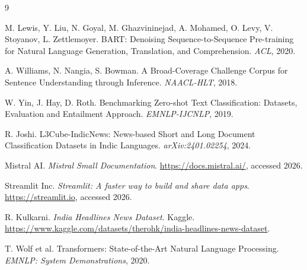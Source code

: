 \documentclass[10pt,twocolumn,letterpaper]{article}
\begin{document}
{\small
\begin{thebibliography}{9}

M. Lewis, Y. Liu, N. Goyal, M. Ghazvininejad, A. Mohamed, O. Levy, V. Stoyanov, L. Zettlemoyer.
\newblock BART: Denoising Sequence-to-Sequence Pre-training for Natural Language Generation, Translation, and Comprehension.
\newblock \emph{ACL}, 2020.

A. Williams, N. Nangia, S. Bowman.
\newblock A Broad-Coverage Challenge Corpus for Sentence Understanding through Inference.
\newblock \emph{NAACL-HLT}, 2018.

W. Yin, J. Hay, D. Roth.
\newblock Benchmarking Zero-shot Text Classification: Datasets, Evaluation and Entailment Approach.
\newblock \emph{EMNLP-IJCNLP}, 2019.

R. Joshi.
\newblock L3Cube-IndicNews: News-based Short and Long Document Classification Datasets in Indic Languages.
\newblock \emph{arXiv:2401.02254}, 2024.

Mistral AI.
\newblock \emph{Mistral Small Documentation}.
\newblock \url{https://docs.mistral.ai/}, accessed 2026.

Streamlit Inc.
\newblock \emph{Streamlit: A faster way to build and share data apps}.
\newblock \url{https://streamlit.io}, accessed 2026.

R. Kulkarni.
\newblock \emph{India Headlines News Dataset}.
\newblock Kaggle. \url{https://www.kaggle.com/datasets/therohk/india-headlines-news-dataset}.

T. Wolf et al.
\newblock Transformers: State-of-the-Art Natural Language Processing.
\newblock \emph{EMNLP: System Demonstrations}, 2020.

\end{thebibliography}
}
\end{document}
